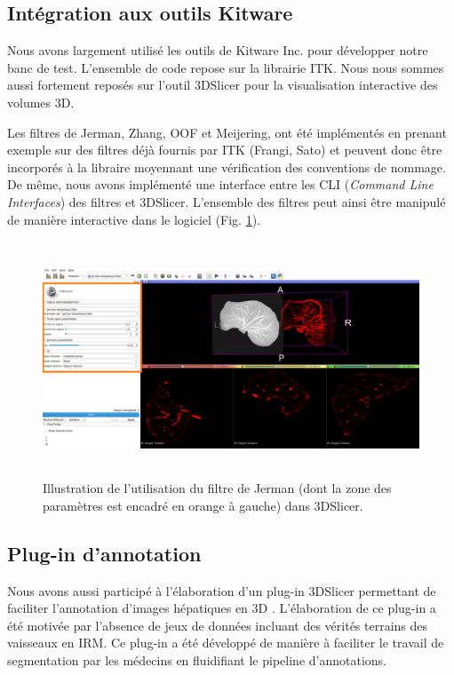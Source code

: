 \subsection{Intégration aux outils Kitware}

Nous avons largement utilisé les outils de Kitware Inc. pour développer notre banc de test. L'ensemble de code repose sur la librairie ITK. Nous nous sommes aussi fortement reposés sur l'outil 3DSlicer pour la visualisation interactive des volumes 3D.

Les filtres de Jerman, Zhang, OOF et Meijering, ont été implémentés en prenant exemple sur des filtres déjà fournis par ITK (Frangi, Sato) et peuvent donc être incorporés à la libraire moyennant une vérification des conventions de nommage. De même, nous avons implémenté une interface entre les CLI (\textit{Command Line Interfaces}) des filtres et 3DSlicer. L'ensemble des filtres peut ainsi être manipulé de manière interactive dans le logiciel (Fig. \ref{fig:slicer_vesselness}).

\begin{figure}[H]
    \includegraphics[height=7cm]{Images/slicer_jerman.png}
    \caption{Illustration de l'utilisation du filtre de Jerman (dont la zone des  paramètres est encadré en orange à gauche) dans 3DSlicer.}
    \label{fig:slicer_vesselness}
\end{figure}

\subsection{Plug-in d'annotation}

Nous avons aussi participé à l'élaboration d'un plug-in 3DSlicer permettant de faciliter l'annotation d'images hépatiques en 3D . L'élaboration de ce plug-in a été motivée par l'absence de jeux de données incluant des vérités terrains des vaisseaux en IRM. Ce plug-in a été développé de manière à faciliter le travail de segmentation par les médecins en fluidifiant le pipeline d'annotations.

